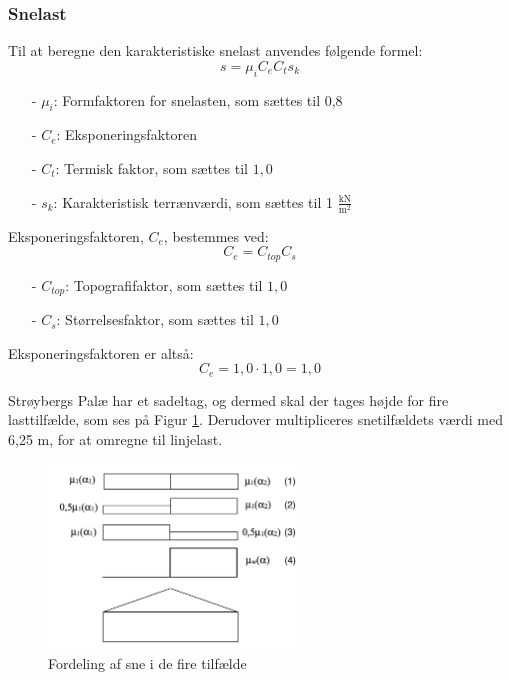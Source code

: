 \subsubsection{Snelast}
Til at beregne den karakteristiske snelast anvendes følgende formel:
\begin{equation}
	s=\mu_iC_eC_ts_k
\end{equation}
\begin{itemize}
	\item[-] $\mu_i$: Formfaktoren for snelasten, som sættes til 0,8 \citep[ tabel 5.2 kapitel 5.3]{EU91}
	\item[-] $C_e$: Eksponeringsfaktoren
	\item[-] $C_t$: Termisk faktor, som sættes til $1,\!0$ \citep[ kapitel 5.2]{EU91}
	\item[-] $s_k$: Karakteristisk terrænværdi, som sættes til 1 $\frac{\text{kN}}{\text{m}^2}$ \citep[ kapitel 4.1]{EU91}
\end{itemize}

Eksponeringsfaktoren, $C_e$, bestemmes ved:
\begin{equation}
	C_e=C_{top}C_s
\end{equation}
\begin{itemize}
	\item[-] $C_{top}$: Topografifaktor, som sættes til $1,\!0$ \citep[ tabel 5.1 kapitel 5.2]{EU91}
	\item[-] $C_s$: Størrelsesfaktor, som sættes til $1,\!0$ \citep[ kapitel 5.2]{EU91}
\end{itemize}

Eksponeringsfaktoren er altså:
\begin{equation}
	C_e = 1,\!0 \cdot 1,\!0 = 1,\!0
\end{equation}

Strøybergs Palæ har et sadeltag, og dermed skal der tages højde for fire lasttilfælde, som ses på Figur \ref{fig:sne}. Derudover multipliceres snetilfældets værdi med 6,25 m, for at omregne til linjelast.

\begin{figure}[htbp]
	\centering
	\includegraphics[width=0.6\textwidth]{billeder/snelasttilfaelde.png}
	\caption{Fordeling af sne i de fire tilfælde \citep[ kapitel 5.3.3]{EU91}}
	\label{fig:sne}
\end{figure}

